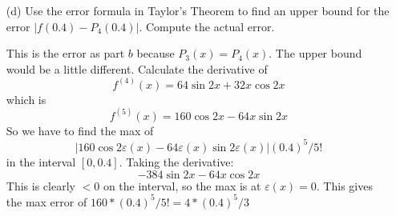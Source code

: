\documentclass{article}
\begin{document}
\begin{itemize}
            \item [(d)] Use the error formula in Taylor's Theorem to find an upper bound for the error $\lvert f(0.4) - P_{4}(0.4) \rvert$. Compute the actual error. 
                \begin{answer}
                    This is the error as part $b$ because $P_{3}(x) = P_{4}(x)$. The upper bound would be a little different. Calculate the derivative of 
                        \begin{equation*}
                            f^{(4)}(x) = 64 \sin{2x} + 32x \cos{2x}
                        \end{equation*}
                    which is
                        \begin{equation*}
                            f^{(5)}(x) = 160 \cos{2x} - 64x \sin{2x}
                        \end{equation*}
                    So we have to find the max of 
                        \begin{equation*}
                            \lvert 160 \cos{2 \varepsilon(x)} - 64 \varepsilon(x) \sin{2 \varepsilon(x)} \rvert (0.4)^{5} / 5!
                        \end{equation*}
                    in the interval $[0, 0.4]$. Taking the derivative:
                        \begin{equation*}
                            -384 \sin{2x} - 64x \cos{2x}
                        \end{equation*}
                    This is clearly $< 0$ on the interval, so the max is at $\varepsilon(x) = 0$. This gives the max error of $160 * (0.4)^{5} / 5! = 4 * (0.4)^{5} / 3$ 
                \end{answer}
        \end{itemize}
\end{document}
